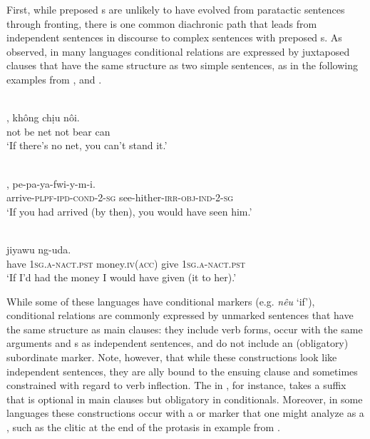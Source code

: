 \documentclass[output=paper]{langsci/langscibook}
\begin{document}
First, while preposed s are unlikely to have evolved from paratactic sentences through fronting, there is one common diachronic path that leads from independent sentences in discourse to complex sentences with preposed s. As \citet[39--70]{Haiman1985} observed, in many languages conditional relations are expressed by juxtaposed clauses that have the same structure as two simple sentences, as in the following examples from  ,   and  .

\ea\label{ex:diessel:3}
\\
,  không  chịu  nôi.\\
       not  be   net  not  bear  can\\
\glt   `If there’s no net, you can’t stand it.'
\z

\ea\label{ex:diessel:4}
\\
,    pe-pa-ya-fwi-y-m-i.\\
       arrive-\textsc{plpf}-\textsc{ipd}-\textsc{cond}-2-\textsc{sg}  see-hither-\textsc{irr}-\textsc{obj}-\textsc{ind}-2-\textsc{sg}\\
\glt   `If you had arrived (by then), you would have seen him.'
\z

\ea\label{ex:diessel:5}
\\
            jiyawu  ng-uda.\\
       have    \textsc{1sg}.\textsc{a-nact.pst}  money.\textsc{iv(acc)}  give  1\textsc{sg.a-nact.pst}\\
\glt   `If I’d had the money I would have given (it to her).'
\z

While some of these languages have conditional markers (e.g.  \textit{nêu} ‘if’), conditional relations are commonly expressed by unmarked sentences that have the same structure as main clauses: they include  verb forms, occur with the same arguments and s as independent sentences, and do not include an (obligatory) subordinate marker. Note, however, that while these constructions look like independent sentences, they are ally bound to the ensuing clause and sometimes constrained with regard to verb inflection. The  in , for instance, takes a  suffix that is optional in main clauses but obligatory in conditionals. Moreover, in some languages these constructions occur with a  or  marker that one might analyze as a , such as the  clitic at the end of the protasis in example  from .
\end{document}
